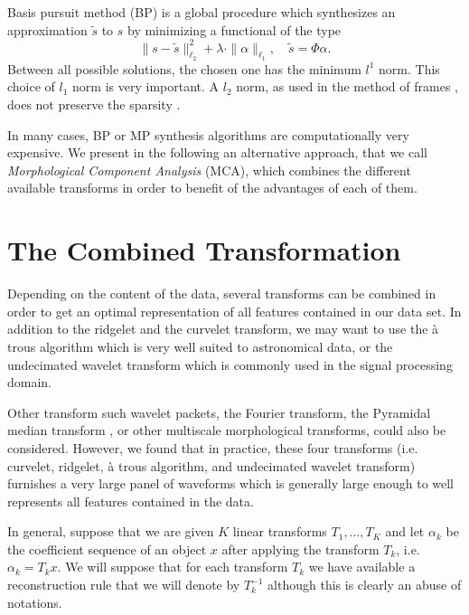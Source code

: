 \bigskip
Basis pursuit method  \cite{wave:donoho98} (BP) is a global procedure which
synthesizes an approximation $\tilde{s}$ to $s$ by minimizing a
functional of the type
\begin{equation}
\|s - \tilde{s}\|_{\ell_2} ^2 + \lambda \cdot \|\alpha\|_{\ell_1}, 
\quad \tilde{s} = \Phi \alpha.  
\label{eqn_mp}
\end{equation}
Between all possible solutions, the chosen one has the minimum $l^1$ norm.
This choice of $l_1$ norm is very important. A $l_2$ norm, as 
used in the method of frames \cite{wave:daube88b},
 does not preserve the sparsity \cite{wave:donoho98}. 
 
In many cases, BP or MP synthesis algorithms are computationally very
expensive. We present in the following an alternative approach, that we call 
{\em Morphological Component Analysis} (MCA), which combines  
 the different available transforms 
in order to benefit of the advantages of each of them. 

\section{The Combined Transformation}

Depending on the content of the data, several transforms 
can be combined in order to get an optimal representation of all 
features contained in our data set. In addition to the ridgelet
and the curvelet transform, we may want to use the \`a trous algorithm
which is very well suited to astronomical data, or the undecimated
wavelet transform which is commonly used in the signal processing domain.

Other transform such wavelet packets, the Fourier transform, 
the Pyramidal median transform \cite{starck:book98}, 
or other multiscale morphological transforms,
could also be considered. However, we found that in practice,
these four transforms (i.e. curvelet, ridgelet, \`a trous algorithm,
and undecimated wavelet transform)
furnishes a very large panel of waveforms
which is generally large enough to well 
represents all features contained in the data.

In general, suppose that we are given $K$ linear transforms $T_1,
\ldots, T_K$ and let $\alpha_k$ be the coefficient sequence of an
object $x$ after applying the transform $T_k$, i.e. $\alpha_k = T_k
x$. We will suppose that for each transform $T_k$ we have available a
reconstruction rule that we will denote by $T^{-1}_k$ although this is
clearly an abuse of notations.

